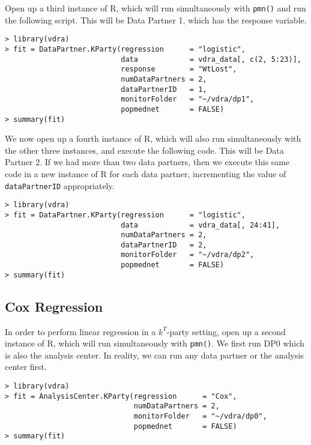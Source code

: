 \documentclass[12]{article}
\begin{document}
Open up a third instance of R, which will run simultaneously with \verb"pmn()" and run the following script.  This will be Data Partner 1, which has the response variable.

\begin{verbatim}
> library(vdra)
> fit = DataPartner.KParty(regression      = "logistic",
                           data            = vdra_data[, c(2, 5:23)],
                           response        = "WtLost",
                           numDataPartners = 2,
                           dataPartnerID   = 1,
                           monitorFolder   = "~/vdra/dp1",
                           popmednet       = FALSE)
> summary(fit)
\end{verbatim}

We now open up a fourth instance of R, which will also run simultaneously with the other three instances, and execute the following code.  This will be Data Partner 2.   If we had more than two data partners, then we execute this same code in a new instance of R for each data partner, incrementing the value of \verb"dataPartnerID" appropriately.

\begin{verbatim}
> library(vdra)
> fit = DataPartner.KParty(regression      = "logistic",
                           data            = vdra_data[, 24:41],
                           numDataPartners = 2,
                           dataPartnerID   = 2,
                           monitorFolder   = "~/vdra/dp2",
                           popmednet       = FALSE)
> summary(fit)
\end{verbatim}

\subsection{Cox Regression}

In order to perform linear regression in a $k^T$-party setting, open up a second instance of R, which will run simultaneously with \verb"pmn()".  We first run DP0 which is also the analysis center.  In reality, we can run any data partner or the analysis center first.

\begin{verbatim}
> library(vdra)
> fit = AnalysisCenter.KParty(regression      = "Cox",
                              numDataPartners = 2,
                              monitorFolder   = "~/vdra/dp0",
                              popmednet       = FALSE)
> summary(fit)
\end{verbatim}
\end{document}
